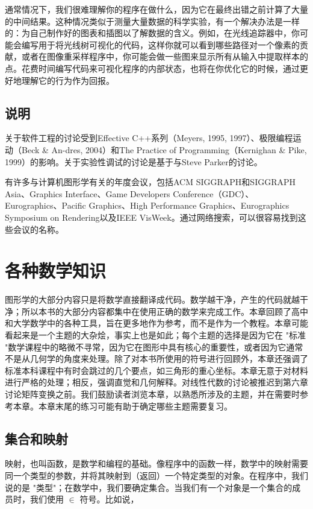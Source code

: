 \documentclass[lang=cn,12pt]{elegantbook}
\begin{document}
通常情况下，我们很难理解你的程序在做什么，因为它在最终出错之前计算了大量的中间结果。这种情况类似于测量大量数据的科学实验，有一个解决办法是一样的：为自己制作好的图表和插图以了解数据的含义。例如，在光线追踪器中，你可能会编写用于将光线树可视化的代码，这样你就可以看到哪些路径对一个像素的贡献，或者在图像重采样程序中，你可能会做一些图来显示所有从输入中提取样本的点。花费时间编写代码来可视化程序的内部状态，也将在你优化它的时候，通过更好地理解它的行为作为回报。


\section*{说明}
关于软件工程的讨论受到Effective C++系列（Meyers, 1995, 1997）、极限编程运动（Beck \& An-dres, 2004）和The Practice of Programming（Kernighan \& Pike, 1999）的影响。关于实验性调试的讨论是基于与Steve Parker的讨论。

有许多与计算机图形学有关的年度会议，包括ACM SIGGRAPH和SIGGRAPH Asia、Graphics Interface、Game Developers Conference（GDC）、Eurographics、Pacific Graphics、High Performance Graphics、Eurographics Symposium on Rendering以及IEEE VisWeek。通过网络搜索，可以很容易找到这些会议的名称。

\chapter{各种数学知识}

图形学的大部分内容只是将数学直接翻译成代码。数学越干净，产生的代码就越干净；所以本书的大部分内容都集中在使用正确的数学来完成工作。本章回顾了高中和大学数学中的各种工具，旨在更多地作为参考，而不是作为一个教程。本章可能看起来是一个主题的大杂烩，事实上也是如此；每个主题的选择是因为它在 "标准 "数学课程中的略微不寻常，因为它在图形中具有核心的重要性，或者因为它通常不是从几何学的角度来处理。除了对本书所使用的符号进行回顾外，本章还强调了标准本科课程中有时会跳过的几个要点，如三角形的重心坐标。本章无意于对材料进行严格的处理；相反，强调直觉和几何解释。对线性代数的讨论被推迟到第六章讨论矩阵变换之前。我们鼓励读者浏览本章，以熟悉所涉及的主题，并在需要时参考本章。本章末尾的练习可能有助于确定哪些主题需要复习。

\section{集合和映射}

映射，也叫函数，是数学和编程的基础。像程序中的函数一样，数学中的映射需要同一个类型的参数，并将其映射到（返回）一个特定类型的对象。在程序中，我们说的是 "类型"；在数学中，我们要确定集合。当我们有一个对象是一个集合的成员时，我们使用 $\in$ 符号。比如说，
\end{document}
